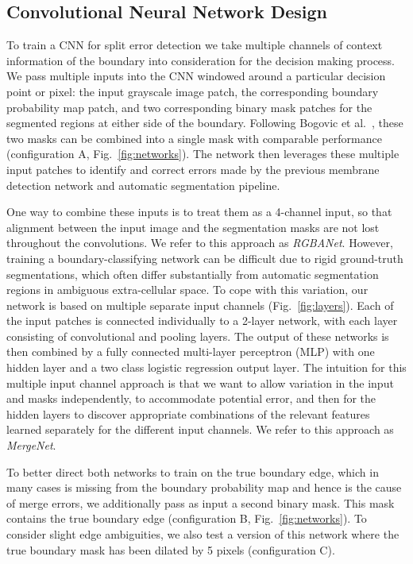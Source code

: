 \subsection{Convolutional Neural Network Design}
To train a CNN for split error detection we take multiple channels of context information of the boundary into consideration for the decision making process. We pass multiple inputs into the CNN windowed around a particular decision point or pixel: the input grayscale image patch, the corresponding boundary probability map patch, and two corresponding binary mask patches for the segmented regions at either side of the boundary. Following Bogovic et al.~\cite{BogovicHJ13}, these two masks can be combined into a single mask with comparable performance (configuration A, Fig.~\ref{fig:networks}). The network then leverages these multiple input patches to identify and correct errors made by the previous membrane detection network and automatic segmentation pipeline.

One way to combine these inputs is to treat them as a 4-channel input, so that alignment between the input image and the segmentation masks are not lost throughout the convolutions. We refer to this approach as \textit{RGBANet}. However, training a boundary-classifying network can be difficult due to rigid ground-truth segmentations, which often differ substantially from automatic segmentation regions in ambiguous extra-cellular space. To cope with this variation, our network is based on multiple separate input channels (Fig.~\ref{fig:layers}). Each of the input patches is connected individually to a 2-layer network, with each layer consisting of convolutional and pooling layers. The output of these networks is then combined by a fully connected multi-layer perceptron (MLP) with one hidden layer and a two class logistic regression output layer. The intuition for this multiple input channel approach is that we want to allow variation in the input and masks independently, to accommodate potential error, and then for the hidden layers to discover appropriate combinations of the relevant features learned separately for the different input channels. We refer to this approach as \textit{MergeNet}.

To better direct both networks to train on the true boundary edge, which in many cases is missing from the boundary probability map and hence is the cause of merge errors, we additionally pass as input a second binary mask. This mask contains the true boundary edge (configuration B, Fig.~\ref{fig:networks}). To consider slight edge ambiguities, we also test a version of this network where the true boundary mask has been dilated by 5 pixels (configuration C).



